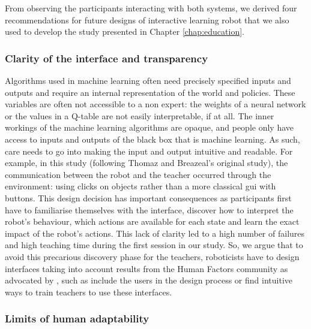From observing the participants interacting with both systems, we derived four recommendations for future designs of interactive learning robot that we also used to develop the study presented in Chapter \ref{chap:education}. 

\subsubsection{Clarity of the interface and transparency}

Algorithms used in machine learning often need precisely specified inputs and outputs and require an internal representation of the world and policies. These variables are often not accessible to a non expert: the weights of a neural network or the values in a Q-table are not easily interpretable, if at all. The inner workings of the machine learning algorithms are opaque, and people only have access to inputs and outputs of the black box that is machine learning. As such, care needs to go into making the input and output intuitive and readable. For example, in this study (following Thomaz and Breazeal's original study), the communication between the robot and the teacher occurred through the environment: using clicks on objects rather than a more classical \gls{gui} with buttons. This design decision has important consequences as participants first have to familiarise themselves with the interface, discover how to interpret the robot's behaviour, which actions are available for each state and learn the exact impact of the robot's actions. This lack of clarity led to a high number of failures and high teaching time during the first session in our study. So, we argue that to avoid this precarious discovery phase for the teachers, roboticists have to design interfaces taking into account results from the Human Factors community as advocated by \cite{adams2002critical}, such as include the users in the design process or find intuitive ways to train teachers to use these interfaces.

\subsubsection{Limits of human adaptability}

